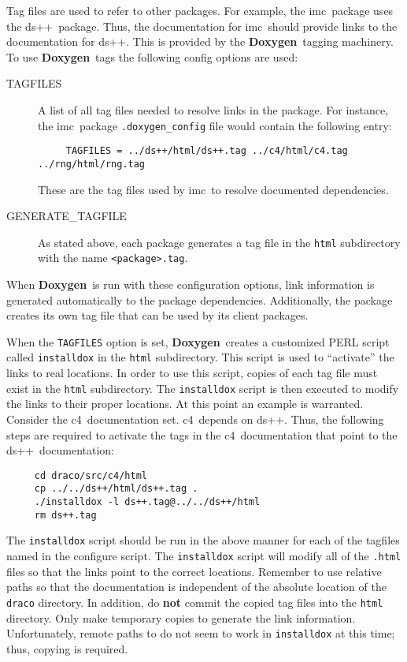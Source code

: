 \documentclass[11pt]{nmemo}
\newcommand{\doxy}{{\normalfont\bfseries Doxygen}}
\newcommand{\imc}{{\normalfont\sffamily imc}}
\newcommand{\dsxx}{{\normalfont\sffamily ds++}}
\newcommand{\cfour}{{\normalfont\sffamily c4}}
\begin{document}
Tag files are used to refer to other packages. For example, the \imc\
package uses the \dsxx\ package.  Thus, the documentation for \imc\
should provide links to the documentation for \dsxx.  This is provided 
by the \doxy\ tagging machinery.  To use \doxy\ tags the following
config options are used:
\begin{description}

\item[\ttfamily TAGFILES] A list of all tag files needed to resolve
  links in the package.  For instance, the \imc\ package
  \texttt{.doxygen\_config} file would contain the following entry:
\begin{verbatim}
     TAGFILES = ../ds++/html/ds++.tag ../c4/html/c4.tag ../rng/html/rng.tag
\end{verbatim}
  These are the tag files used by \imc\ to resolve documented
  dependencies.

\item[\ttfamily GENERATE\_TAGFILE] As stated above, each package
  generates a tag file in the \texttt{html} subdirectory with the name 
  \texttt{<package>.tag}.

\end{description}
When \doxy\ is run with these configuration options, link information
is generated automatically to the package dependencies.  Additionally, 
the package creates its own tag file that can be used by its client
packages.

When the \texttt{TAGFILES} option is set, \doxy\ creates a customized
PERL script called \texttt{installdox} in the \texttt{html}
subdirectory.  This script is used to ``activate'' the links to real
locations.  In order to use this script, copies of each tag file must
exist in the \texttt{html} subdirectory.  The \texttt{installdox}
script is then executed to modify the links to their proper locations.
At this point an example is warranted.  Consider the \cfour\ 
documentation set.  \cfour\ depends on \dsxx.  Thus, the following
steps are required to activate the tags in the \cfour\ documentation
that point to the \dsxx\ documentation:
\begin{verbatim}
     cd draco/src/c4/html
     cp ../../ds++/html/ds++.tag .
     ./installdox -l ds++.tag@../../ds++/html
     rm ds++.tag
\end{verbatim}
 The \texttt{installdox} script should be run in the above manner for each
of the tagfiles named in the configure script.
The \texttt{installdox} script will modify all of the \texttt{.html}
files so that the links point to the correct locations.  Remember to
use relative paths so that the documentation is independent of the
absolute location of the \texttt{draco} directory.  In addition, do
{\bf not} commit the copied tag files into the \texttt{html}
directory.  Only make temporary copies to generate the link
information.  Unfortunately, remote paths to do not seem to work in
\texttt{installdox} at this time; thus, copying is required.
\end{document}
